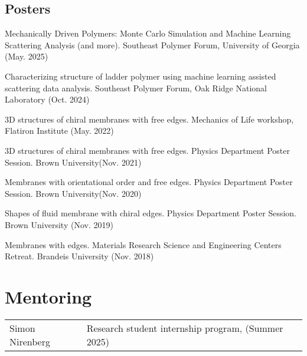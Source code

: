 \documentclass[11pt,letterpaper]{article}
\begin{document}
\subsection*{Posters}
\begin{etaremune}
    \item Mechanically Driven Polymers: Monte Carlo Simulation and Machine Learning Scattering Analysis (and more). Southeast Polymer Forum, University of Georgia  (May. 2025)
    \item Characterizing structure of ladder polymer using machine learning assisted scattering data analysis. Southeast Polymer Forum, Oak Ridge National Laboratory (Oct. 2024)
    \item 3D structures of chiral membranes with free edges. Mechanics of Life workshop, Flatiron Institute (May. 2022)
    \item 3D structures of chiral membranes with free edges. Physics Department Poster Session. Brown University(Nov. 2021)
    \item Membranes with orientational order and free edges. Physics Department Poster Session. Brown University(Nov. 2020)
    \item Shapes of fluid membrane with chiral edges. Physics Department Poster Session. Brown University (Nov. 2019)
    \item Membranes with edges. Materials Research Science and Engineering Centers Retreat. Brandeis University (Nov. 2018)
\end{etaremune}


\section*{Mentoring}
\vspace*{-0.15in}
\begin{longtable}{l p{\linewidth}}
    Simon Nirenberg & Research student internship program, (Summer 2025)
\end{longtable}
\end{document}
